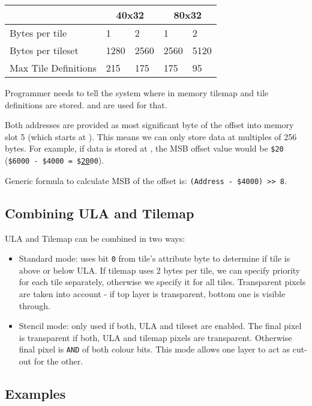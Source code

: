\documentclass[12pt,twoside,openright,a4paper]{book}
\begin{document}
{
	\def\arraystretch{1.2}
	\begin{tabular}{|l|l|l|l|l|}
		\hline
		& \multicolumn{2}{c|}{40x32} & \multicolumn{2}{c|}{80x32} \\
		\hline
		Bytes per tile & 1 & 2 & 1 & 2 \\
		\hline
		Bytes per tileset & 1280 & 2560 & 2560 & 5120 \\
		\hline
		Max Tile Definitions & 215 & 175 & 175 & 95 \\
		\hline
	\end{tabular}
}

Programmer needs to tell the system where in memory tilemap and tile definitions are stored.  and  are used for that.

Both addresses are provided as most significant byte of the offset into memory slot 5 (which starts at ). This means we can only store data at multiples of 256 bytes. For example, if data is stored at , the MSB offset value would be {\tt \$20} ({\tt \$6000 - \$4000 = \$\underline{20}00}).

Generic formula to calculate MSB of the offset is: {\tt (Address - \$4000) >> 8}.


\subsection{Combining ULA and Tilemap}

ULA and Tilemap can be combined in two ways:

\begin{itemize}[topsep=1pt,itemsep=1pt]
	\item Standard mode: uses bit {\tt 0} from tile's attribute byte to determine if tile is above or below ULA. If tilemap uses 2 bytes per tile, we can specify priority for each tile separately, otherwise we specify it for all tiles. Transparent pixels are taken into account - if top layer is transparent, bottom one is visible through.
	
	\item Stencil mode: only used if both, ULA and tileset are enabled. The final pixel is transparent if both, ULA and tilemap pixels are transparent. Otherwise final pixel is {\tt AND} of both colour bits. This mode allows one layer to act as cut-out for the other.
\end{itemize}


\subsection{Examples}
\end{document}
